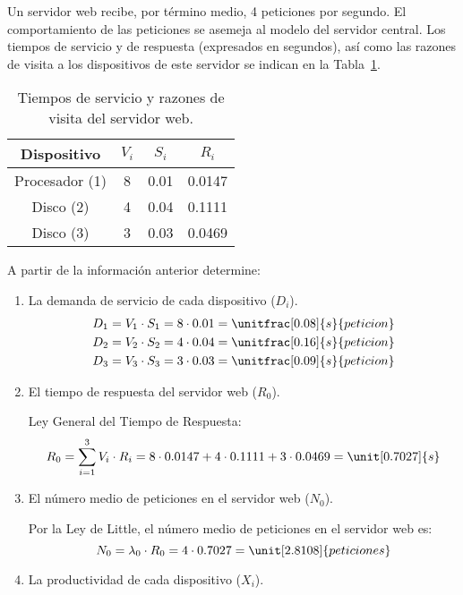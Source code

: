 \begin{ejercicio}\label{ej:5.8}
    Un servidor web recibe, por término medio, 4 peticiones por segundo. El comportamiento de las peticiones se asemeja al modelo del servidor central. Los tiempos de servicio y de respuesta (expresados en segundos), así como las razones de visita a los dispositivos de este servidor se indican en la Tabla~\ref{tab:5.8}.
    \begin{table}[h]
        \centering
        \begin{tabular}{|c|c|c|c|}
            \hline
            Dispositivo & $V_i$ & $S_i$ & $R_i$ \\
            \hline
            Procesador (1) & 8 & 0.01 & 0.0147 \\
            Disco (2) & 4 & 0.04 & 0.1111 \\
            Disco (3) & 3 & 0.03 & 0.0469 \\
            \hline
        \end{tabular}
        \caption{Tiempos de servicio y razones de visita del servidor web.}
        \label{tab:5.8}
    \end{table}
    A partir de la información anterior determine:
    \begin{enumerate}
        \item La demanda de servicio de cada dispositivo ($D_i$).
        \begin{align*}
            D_1 &= V_1 \cdot S_1 = 8 \cdot 0.01 = \unitfrac[0.08]{s}{peticion} \\
            D_2 &= V_2 \cdot S_2 = 4 \cdot 0.04 = \unitfrac[0.16]{s}{peticion} \\
            D_3 &= V_3 \cdot S_3 = 3 \cdot 0.03 = \unitfrac[0.09]{s}{peticion}
        \end{align*}
        \item El tiempo de respuesta del servidor web ($R_0$).
        
        Ley General del Tiempo de Respuesta:
        \begin{equation*}
            R_0 = \sum_{i=1}^{3} V_i \cdot R_i = 8 \cdot 0.0147 + 4 \cdot 0.1111 + 3 \cdot 0.0469 = \unit[0.7027]{s}
        \end{equation*}
        \item El número medio de peticiones en el servidor web ($N_0$).
        
        Por la Ley de Little, el número medio de peticiones en el servidor web es:
        \begin{equation*}
            N_0 = \lambda_0 \cdot R_0 = 4 \cdot 0.7027 = \unit[2.8108]{peticiones}
        \end{equation*}
        \item La productividad de cada dispositivo ($X_i$).
        

\end{enumerate}
\end{ejercicio}
